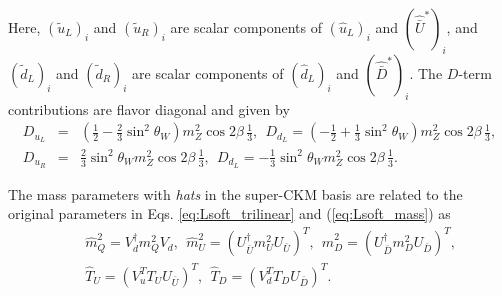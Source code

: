 \documentclass[preprint,3p,12pt]{elsarticle}
\begin{document}
 Here, $(\tilde u_L)_i$ and $(\tilde u_R)_i$ are scalar components of $(\hat u_L)_i$ and $(\hat{\bar U}^*)_i$, and 
 $(\tilde d_L)_i$ and $(\tilde d_R)_i$ are scalar components of $(\hat d_L)_i$ and $(\hat{\bar D}^*)_i$. The $D$-term contributions are flavor diagonal and given by
\begin{eqnarray}
D_{u_L} &=& (\frac{1}{2} - \frac{2}{3} \sin^2\theta_W) m_Z^2 \cos2 \beta \, \frac{1}{3}, \ \
D_{d_L} = (-\frac{1}{2} + \frac{1}{3} \sin^2\theta_W) m_Z^2 \cos2 \beta \, \frac{1}{3}, \nonumber \\
D_{u_R}&=& \frac{2}{3} \sin^2\theta_W m_Z^2 \cos2 \beta \, \frac{1}{3}, \ \ 
D_{d_L} =  -\frac{1}{3} \sin^2\theta_W m_Z^2 \cos2 \beta \, \frac{1}{3}.
\end{eqnarray}

 The mass parameters with {\it hats} in the super-CKM basis are related to the original parameters in Eqs. \eqref{eq:Lsoft_trilinear} and (\ref{eq:Lsoft_mass}) as
 \begin{eqnarray}
&& \hat m_{Q}^2 = V_{d}^\dag m_{Q}^2 V_d, \ \ \hat m_U^2  = (U_{\bar U}^\dag m_{U}^2 U_{\bar U})^T, 
\ \ \hat m_D^2  = (U_{\bar D}^\dag m_{D}^2 U_{\bar D})^T, \nonumber \\
&& \hat T_U = (V_u^T T_U U_{\bar U})^T, \ \ 
\hat T_D = (V_d^T T_D U_{\bar D})^T.
\end{eqnarray}
\end{document}
